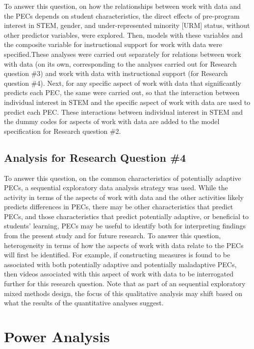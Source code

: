 \documentclass[]{msu-thesis}
\theoremstyle{definition}
\theoremstyle{definition}
\theoremstyle{definition}
\theoremstyle{remark}
\begin{document}
To answer this question, on how the relationships between work with data
and the PECs depends on student characteristics, the direct effects of
pre-program interest in STEM, gender, and under-represented minority
{[}URM{]} status, without other predictor variables, were explored.
Then, models with these variables and the composite variable for
instructional support for work with data were specified.These analyses
were carried out separately for relations between work with data (on its
own, corresponding to the analyses carried out for Research question
\#3) and work with data with instructional support (for Research
question \#4). Next, for any specific aspect of work with data that
significantly predicts each PEC, the same were carried out, so that the
interaction between individual interest in STEM and the specific aspect
of work with data are used to predict each PEC. These interactions
between individual interest in STEM and the dummy codes for aspects of
work with data are added to the model specification for Research
question \#2.

\subsection{Analysis for Research Question
\#4}\label{analysis-for-research-question-4}

To answer this question, on the common characteristics of potentially
adaptive PECs, a sequential exploratory data analysis strategy was used.
While the activity in terms of the aspects of work with data and the
other activities likely predicts differences in PECs, there may be other
characteristics that predict PECs, and those characteristics that
predict potentially adaptive, or beneficial to students' learning, PECs
may be useful to identify both for interpreting findings from the
present study and for future research. To answer this question,
heterogeneity in terms of how the aspects of work with data relate to
the PECs will first be identified. For example, if constructing measures
is found to be associated with both potentially adaptive and potentially
maladaptive PECs, then videos associated with this aspect of work with
data to be interrogated further for this research question. Note that as
part of an sequential exploratory mixed methods design, the focus of
this qualitative analysis may shift based on what the results of the
quantitative analyses suggest.

\section{Power Analysis}\label{power-analysis}
\end{document}
